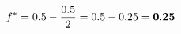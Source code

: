 \documentclass[preview]{standalone}
\begin{document}
\begin{align*}
\special{dvisvgm:raw <g id='unique000'>}f^* = 0.5 - \frac{0.5}{2} = 0.5 - 0.25 = \mathbf{0.25}\special{dvisvgm:raw </g>}
\end{align*}
\end{document}
